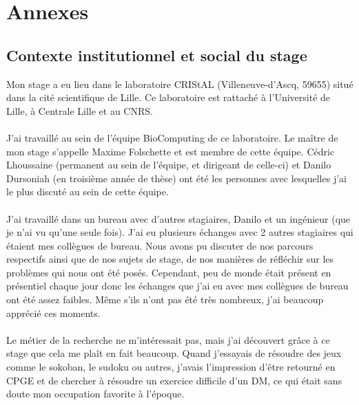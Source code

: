 \documentclass[10pt,a4paper]{article}
\begin{document}
\newpage


\newpage
\section{Annexes}
\subsection{Contexte institutionnel et social du stage}
Mon stage a eu lieu dans le laboratoire CRIStAL (Villeneuve-d'Ascq, 59655) situé dans la cité scientifique de Lille. Ce laboratoire est rattaché à l’Université de Lille, à Centrale Lille et au CNRS.\\ \\
J'ai travaillé au sein de l'équipe BioComputing de ce laboratoire. Le maître de mon stage s'appelle Maxime Folschette et est membre de cette équipe. Cédric Lhoussaine (permanent au sein de l'équipe, et dirigeant de celle-ci) et 
Danilo Dursoniah (en troisième année de thèse) ont été les personnes avec lesquelles j'ai le plus discuté au sein de cette équipe.\\ \\
J'ai travaillé dans un bureau avec d'autres stagiaires, Danilo et un ingénieur (que je n'ai vu qu'une seule fois). J'ai eu plusieurs échanges avec 2 autres stagiaires qui étaient mes collègues de bureau. Nous avons pu discuter de 
nos parcours respectifs ainsi que de nos sujets de stage, de nos manières de réfléchir sur les problèmes qui nous ont été posés. Cependant, peu de monde était présent en présentiel chaque jour donc les échanges que j'ai eu avec mes 
collègues de bureau ont été assez faibles. Même s'ils n'ont pas été très nombreux, j'ai beaucoup apprécié ces moments.\\ \\
Le métier de la recherche ne m'intéressait pas, mais j'ai découvert grâce à ce stage que cela me plaît en fait beaucoup. Quand j'essayais de résoudre des jeux comme le sokoban, le sudoku ou autres, j'avais l'impression d'être 
retourné en CPGE et de chercher à résoudre un exercice difficile d'un DM, ce qui était sans doute mon occupation favorite à l'époque.\\ \\ \\
\end{document}
